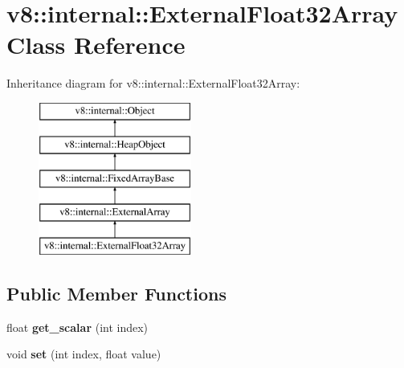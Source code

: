 \hypertarget{classv8_1_1internal_1_1_external_float32_array}{}\section{v8\+:\+:internal\+:\+:External\+Float32\+Array Class Reference}
\label{classv8_1_1internal_1_1_external_float32_array}
Inheritance diagram for v8\+:\+:internal\+:\+:External\+Float32\+Array\+:\begin{figure}[H]
\begin{center}
\leavevmode
\includegraphics[height=5.000000cm]{classv8_1_1internal_1_1_external_float32_array}
\end{center}
\end{figure}
\subsection*{Public Member Functions}
\begin{DoxyCompactItemize}
\item 
\hypertarget{classv8_1_1internal_1_1_external_float32_array_a726291a21ec09ee83879e8f0a7d8cf5e}{}float {\bfseries get\+\_\+scalar} (int index)\label{classv8_1_1internal_1_1_external_float32_array_a726291a21ec09ee83879e8f0a7d8cf5e}

\item 
\hypertarget{classv8_1_1internal_1_1_external_float32_array_ad533b930bf30284321ccda1ef3f961a7}{}void {\bfseries set} (int index, float value)\label{classv8_1_1internal_1_1_external_float32_array_ad533b930bf30284321ccda1ef3f961a7}

\end{DoxyCompactItemize}
